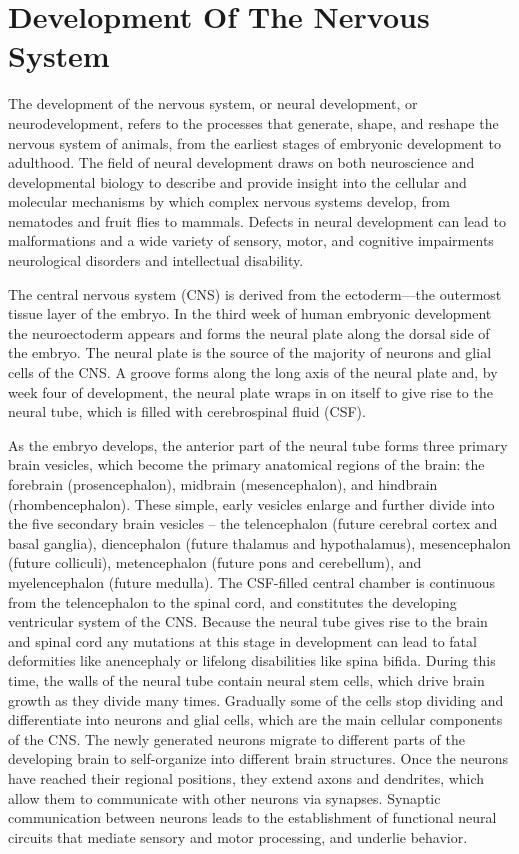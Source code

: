 \hypertarget{development-of-the-nervous-system-1}{%
\chapter{Development Of The Nervous System}\label{development-of-the-nervous-system-1}}

The development of the nervous system, or neural development, or neurodevelopment, refers to the processes that generate, shape, and reshape the nervous system of animals, from the earliest stages of embryonic development to adulthood. The field of neural development draws on both neuroscience and developmental biology to describe and provide insight into the cellular and molecular mechanisms by which complex nervous systems develop, from nematodes and fruit flies to mammals. Defects in neural development can lead to malformations and a wide variety of sensory, motor, and cognitive impairments neurological disorders and intellectual disability.

The central nervous system (CNS) is derived from the ectoderm---the outermost tissue layer of the embryo. In the third week of human embryonic development the neuroectoderm appears and forms the neural plate along the dorsal side of the embryo. The neural plate is the source of the majority of neurons and glial cells of the CNS. A groove forms along the long axis of the neural plate and, by week four of development, the neural plate wraps in on itself to give rise to the neural tube, which is filled with cerebrospinal fluid (CSF).

As the embryo develops, the anterior part of the neural tube forms three primary brain vesicles, which become the primary anatomical regions of the brain: the forebrain (prosencephalon), midbrain (mesencephalon), and hindbrain (rhombencephalon). These simple, early vesicles enlarge and further divide into the five secondary brain vesicles -- the telencephalon (future cerebral cortex and basal ganglia), diencephalon (future thalamus and hypothalamus), mesencephalon (future colliculi), metencephalon (future pons and cerebellum), and myelencephalon (future medulla). The CSF-filled central chamber is continuous from the telencephalon to the spinal cord, and constitutes the developing ventricular system of the CNS. Because the neural tube gives rise to the brain and spinal cord any mutations at this stage in development can lead to fatal deformities like anencephaly or lifelong disabilities like spina bifida. During this time, the walls of the neural tube contain neural stem cells, which drive brain growth as they divide many times. Gradually some of the cells stop dividing and differentiate into neurons and glial cells, which are the main cellular components of the CNS. The newly generated neurons migrate to different parts of the developing brain to self-organize into different brain structures. Once the neurons have reached their regional positions, they extend axons and dendrites, which allow them to communicate with other neurons via synapses. Synaptic communication between neurons leads to the establishment of functional neural circuits that mediate sensory and motor processing, and underlie behavior.



